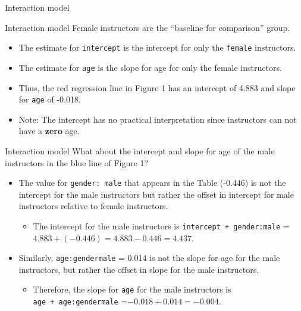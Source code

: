 \documentclass[
  ignorenonframetext,
]{beamer}
\providecommand{\tightlist}{%
  \setlength{\itemsep}{0pt}\setlength{\parskip}{0pt}}
\begin{document}
\begin{frame}[fragile]{Interaction model}
\normalsize
\end{frame}

\begin{frame}[fragile]{Interaction model}
\protect\hypertarget{interaction-model-2}{}
Female instructors are the ``baseline for comparison'' group.

\begin{itemize}
\tightlist
\item
  The estimate for \texttt{intercept} is the intercept for only the
  \texttt{female} instructors.
\item
  The estimate for \texttt{age} is the slope for age for only the female
  instructors.
\item
  Thus, the red regression line in Figure 1 has an intercept of 4.883
  and slope for \texttt{age} of -0.018.
\item
  Note: The intercept has no practical interpretation since instructors
  can not have a \textbf{zero} age.
\end{itemize}
\end{frame}

\begin{frame}[fragile]{Interaction model}
\protect\hypertarget{interaction-model-3}{}
What about the intercept and slope for age of the male instructors in
the blue line of Figure 1?

\begin{itemize}
\item
  The value for \texttt{gender:\ male} that appears in the Table
  (-0.446) is not the intercept for the male instructors but rather the
  offset in intercept for male instructors relative to female
  instructors.

  \begin{itemize}
  \tightlist
  \item
    The intercept for the male instructors is
    \texttt{intercept\ +\ gender:male} =
    \(4.883 + (-0.446) = 4.883 - 0.446 = 4.437\).
  \end{itemize}
\item
  Similarly, \texttt{age:gendermale} = 0.014 is not the slope for age
  for the male instructors, but rather the offset in slope for the male
  instructors.

  \begin{itemize}
  \tightlist
  \item
    Therefore, the slope for \texttt{age} for the male instructors is
    \texttt{age\ +\ age:gendermale} =\(-0.018 + 0.014 = -0.004\).
  \end{itemize}
\end{itemize}
\end{frame}
\end{document}
